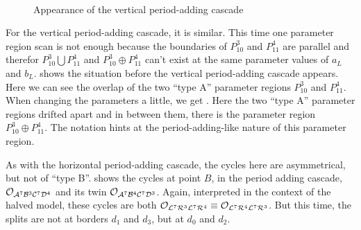 \begin{figure}
	\centering
	 \\
	\caption{Appearance of the vertical period-adding cascade}
	\label{fig:minrep.add.app.vert}
\end{figure}

For the vertical period-adding cascade, it is similar.
This time one parameter region scan is not enough because the boundaries of $P_{10}^3$ and $P_{11}^4$ are parallel and therefor $P_{10}^3 \bigcup P_{11}^4$ and $P_{10}^3 \oplus P_{11}^4$ can't exist at the same parameter values of $a_L$ and $b_L$.
 shows the situation before the vertical period-adding cascade appears.
Here we can see the overlap of the two ``type A'' parameter regions $P_{10}^3$ and $P_{11}^4$.
When changing the parameters a little, we get .
Here the two ``type A'' parameter regions drifted apart and in between them, there is the parameter region $P_{10}^3 \oplus P_{11}^4$.
The notation hints at the period-adding-like nature of this parameter region.

As with the horizontal period-adding cascade, the cycles here are asymmetrical, but not of ``type B''.
 shows the cycles at point $B$, in the period adding cascade, $\mathcal{O}_{\mathcal{A}^7\mathcal{B}^3\mathcal{C}^7\mathcal{D}^4}$ and its twin $\mathcal{O}_{\mathcal{A}^7\mathcal{B}^4\mathcal{C}^7\mathcal{D}^3}$.
Again, interpreted in the context of the halved model, these cycles are both $\mathcal{O}_{\mathcal{L}^7\mathcal{R}^3\mathcal{L}^7\mathcal{R}^4} \equiv \mathcal{O}_{\mathcal{L}^7\mathcal{R}^4\mathcal{L}^7\mathcal{R}^3}$.
But this time, the splits are not at borders $d_1$ and $d_3$, but at $d_0$ and $d_2$.

